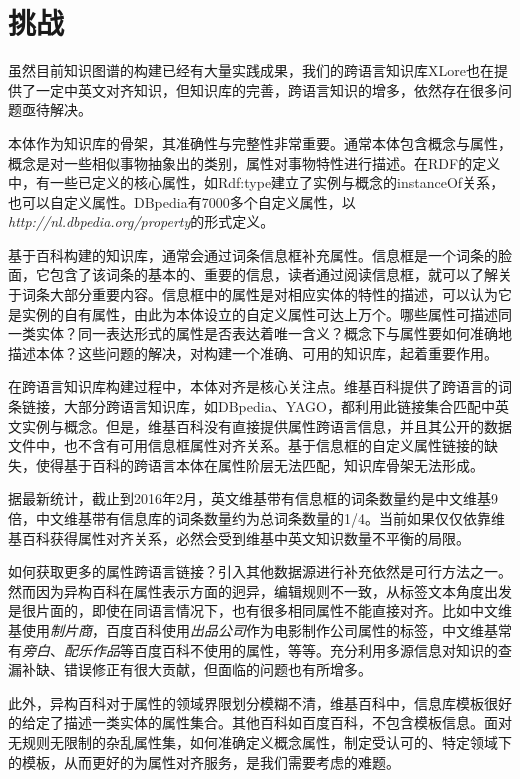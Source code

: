 \section{挑战}

虽然目前知识图谱的构建已经有大量实践成果，我们的跨语言知识库XLore也在提供了一定中英文对齐知识，但知识库的完善，跨语言知识的增多，依然存在很多问题亟待解决。

本体作为知识库的骨架，其准确性与完整性非常重要。通常本体包含概念与属性，概念是对一些相似事物抽象出的类别，属性对事物特性进行描述。在RDF的定义中，有一些已定义的核心属性，如Rdf:type建立了实例与概念的instanceOf关系，也可以自定义属性。DBpedia有7000多个自定义属性，以\textit{http://nl.dbpedia.org/property}的形式定义。

基于百科构建的知识库，通常会通过词条信息框补充属性。信息框是一个词条的脸面，它包含了该词条的基本的、重要的信息，读者通过阅读信息框，就可以了解关于词条大部分重要内容。信息框中的属性是对相应实体的特性的描述，可以认为它是实例的自有属性，由此为本体设立的自定义属性可达上万个。哪些属性可描述同一类实体？同一表达形式的属性是否表达着唯一含义？概念下与属性要如何准确地描述本体？这些问题的解决，对构建一个准确、可用的知识库，起着重要作用。

在跨语言知识库构建过程中，本体对齐是核心关注点。维基百科提供了跨语言的词条链接，大部分跨语言知识库，如DBpedia、YAGO，都利用此链接集合匹配中英文实例与概念。但是，维基百科没有直接提供属性跨语言信息，并且其公开的数据文件中，也不含有可用信息框属性对齐关系。基于信息框的自定义属性链接的缺失，使得基于百科的跨语言本体在属性阶层无法匹配，知识库骨架无法形成。

据最新统计，截止到2016年2月，英文维基带有信息框的词条数量约是中文维基9倍，中文维基带有信息库的词条数量约为总词条数量的1/4。当前如果仅仅依靠维基百科获得属性对齐关系，必然会受到维基中英文知识数量不平衡的局限。

如何获取更多的属性跨语言链接？引入其他数据源进行补充依然是可行方法之一。然而因为异构百科在属性表示方面的迥异，编辑规则不一致，从标签文本角度出发是很片面的，即使在同语言情况下，也有很多相同属性不能直接对齐。比如中文维基使用\textit{制片商}，百度百科使用\textit{出品公司}作为电影制作公司属性的标签，中文维基常有\textit{旁白}、\textit{配乐作品}等百度百科不使用的属性，等等。充分利用多源信息对知识的查漏补缺、错误修正有很大贡献，但面临的问题也有所增多。

此外，异构百科对于属性的领域界限划分模糊不清，维基百科中，信息库模板很好的给定了描述一类实体的属性集合。其他百科如百度百科，不包含模板信息。面对无规则无限制的杂乱属性集，如何准确定义概念属性，制定受认可的、特定领域下的模板，从而更好的为属性对齐服务，是我们需要考虑的难题。


